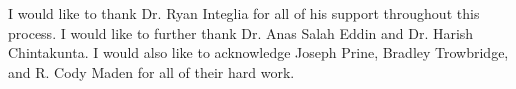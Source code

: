 \documentclass[
11pt, %
oneside, %
english, %
singlespacing, %
parskip, %
headsepline, %
]{MastersDoctoralThesis} %
\begin{document}


\begin{acknowledgements}
\addchaptertocentry{\acknowledgementname} %

I would like to thank Dr. Ryan Integlia for all of his support throughout this process. I would like to further thank Dr. Anas Salah Eddin and Dr. Harish Chintakunta. I would also like to acknowledge Joseph Prine, Bradley Trowbridge, and  R. Cody Maden for all of their hard work. 

\end{acknowledgements}


\tableofcontents %

\listoffigures %


\end{document}
